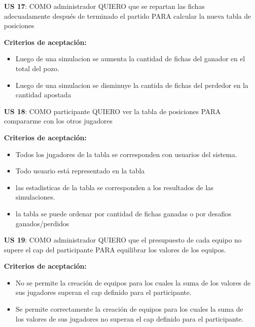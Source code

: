 \begin{tcolorbox}
\textbf{US 17}: COMO administrador QUIERO que se repartan las fichas adecuadamente después de terminado el partido PARA calcular la nueva tabla de posiciones

\vline

\textbf{Criterios de aceptación:}
\begin{itemize}
\item Luego de una simulacion se aumenta la cantidad de fichas del ganador en el total del pozo.
\item Luego de una simulacion se disminuye la cantida de fichas del perdedor en la cantidad apostada
\end{itemize}
\end{tcolorbox}
\vspace{10pt}

\begin{tcolorbox}
\textbf{US 18}: COMO participante QUIERO ver la tabla de posiciones PARA compararme con los otros jugadores

\vline

\textbf{Criterios de aceptación:}
\begin{itemize}
\item Todos los jugadores de la tabla se corresponden con usuarios del sistema.
\item Todo usuario está representado en la tabla
\item las estadisticas de la tabla se corresponden a los resultados de las simulaciones.
\item la tabla se puede ordenar por cantidad de fichas ganadas o por desafios ganados/perdidos
\end{itemize}
\end{tcolorbox}
\vspace{10pt}

\begin{tcolorbox}
\textbf{US 19}: COMO administrador QUIERO que el presupuesto de cada equipo no supere el cap del participante PARA equilibrar los valores de los equipos.

\vline

\textbf{Criterios de aceptación:}
\begin{itemize}
\item No se permite la creación de equipos para los cuales la suma de los valores de sus jugadores superan el cap definido para el participante.
\item Se permite correctamente la creación de equipos para los cuales la suma de los valores de sus jugadores no superan el cap definido para el participante.
\end{itemize}
\end{tcolorbox}
\vspace{10pt}

